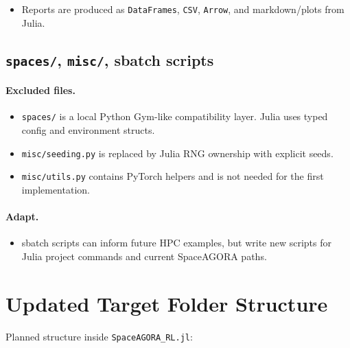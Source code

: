 \documentclass[11pt]{article}
\begin{document}
\begin{itemize}
\item Reports are produced as \texttt{DataFrames}, \texttt{CSV}, \texttt{Arrow}, and markdown/plots from Julia.
\end{itemize}


\subsection{\texttt{spaces/}, \texttt{misc/}, sbatch scripts}

\paragraph{Excluded files.}

\begin{itemize}
\item \texttt{spaces/} is a local Python Gym-like compatibility layer. Julia uses typed config and environment structs.
\item \texttt{misc/seeding.py} is replaced by Julia RNG ownership with explicit seeds.
\item \texttt{misc/utils.py} contains PyTorch helpers and is not needed for the first implementation.
\end{itemize}

\paragraph{Adapt.}

\begin{itemize}
\item sbatch scripts can inform future HPC examples, but write new scripts for Julia project commands and current SpaceAGORA paths.


\end{itemize}
\section{Updated Target Folder Structure}

Planned structure inside \texttt{SpaceAGORA\_RL.jl}:
\end{document}
